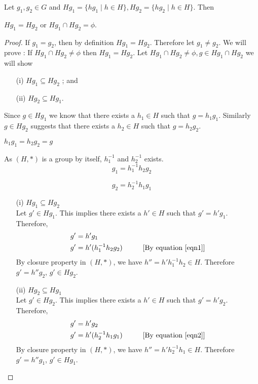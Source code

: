 \begin{lemma}
\label{lag1}
Let $g_1,g_2\in G$ and $Hg_1 = \{hg_1\mid h\in H\},Hg_2 = \{hg_2\mid h\in H\}$. Then 
\begin{center}
$Hg_1=Hg_2$ or $Hg_1\cap Hg_2 = \phi$.
\end{center}
\end{lemma}
\begin{proof}
If $g_1=g_2$, then by definition $Hg_1=Hg_2$. Therefore let $g_1\neq g_2$. We will prove : If $Hg_1\cap Hg_2 \neq \phi$ then $Hg_1 = Hg_2$. Let $Hg_1\cap Hg_2 \neq \phi, g\in Hg_1\cap Hg_2$ we will show 
\begin{itemize}
\item[(i)] $Hg_1\subseteq Hg_2$ ; and
\item[(ii)] $Hg_2\subseteq Hg_1$.
\end{itemize}

Since $g\in Hg_1$ we know that there exists a $h_1\in H$ such that $g=h_1g_1$. Similarly $g\in Hg_2$ suggests that there exists a $h_2\in H$ such that $g=h_2g_2$.
\begin{center}
$h_1g_1=h_2g_2=g$
\end{center}   
As $(H,*)$ is a group by itself, $h_1^{-1}$ and $h_2^{-1}$ exists.
\begin{equation}
\label{eqn1}
g_1= h_1^{-1}h_2g_2
\end{equation}

\begin{equation}
\label{eqn2}
g_2 = h_2^{-1}h_1g_1
\end{equation}

\begin{itemize}
\item[(i)] $Hg_1\subseteq Hg_2$ \\
Let $g'\in Hg_1$. This implies there exists a $h'\in H$ such that $g'=h'g_1$. Therefore,
\begin{align*}
g'&= h'g_1\\
g'&= h'(h_1^{-1}h_2g_2) \hspace*{10mm} [\text{By equation \eqref{eqn1}}]
\end{align*} 
By closure property in $(H,*)$, we have $h''=h'h_1^{-1}h_2\in H$. Therefore $g'=h''g_2$, $g'\in Hg_2$.
\item[(ii)] $Hg_2\subseteq Hg_1$ \\
Let $g'\in Hg_2$. This implies there exists a $h'\in H$ such that $g'=h'g_2$. Therefore,
\begin{align*}
g'&= h'g_2\\
g'&= h'(h_2^{-1}h_1g_1) \hspace*{10mm} [\text{By equation \eqref{eqn2}}]
\end{align*} 
By closure property in $(H,*)$, we have $h''=h'h_2^{-1}h_1\in H$. Therefore $g'=h''g_1$, $g'\in Hg_1$.
\end{itemize}
\end{proof}


